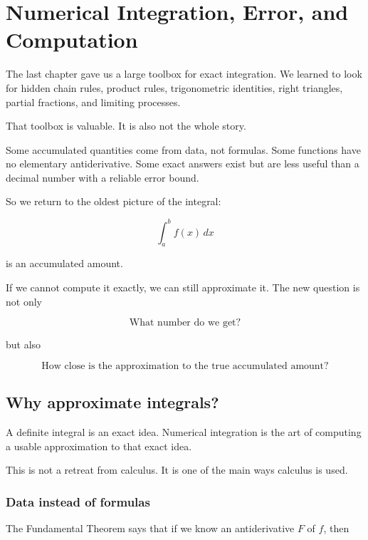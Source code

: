 
\chapter{Numerical Integration, Error, and Computation}
\label{chap:numerical-integration-error-computation}

The last chapter gave us a large toolbox for exact integration.  We learned to look for
hidden chain rules, product rules, trigonometric identities, right triangles, partial
fractions, and limiting processes.

That toolbox is valuable.  It is also not the whole story.

Some accumulated quantities come from data, not formulas.  Some functions have no
elementary antiderivative.  Some exact answers exist but are less useful than a decimal
number with a reliable error bound.

So we return to the oldest picture of the integral:

\[
\int_a^b f(x)\,dx
\]

is an accumulated amount.

If we cannot compute it exactly, we can still approximate it.  The new question is not
only

\[
\text{What number do we get?}
\]

but also

\[
\boxed{
\text{How close is the approximation to the true accumulated amount?}
}
\]

\section{Why approximate integrals?}
\label{sec:why-approximate-integrals}

A definite integral is an exact idea.  Numerical integration is the art of computing a
usable approximation to that exact idea.

This is not a retreat from calculus.  It is one of the main ways calculus is used.

\subsection{Data instead of formulas}
\label{subsec:data-instead-of-formulas-numerical-integration}

The Fundamental Theorem says that if we know an antiderivative \(F\) of \(f\), then

